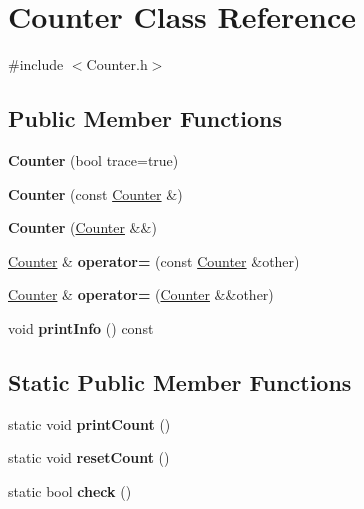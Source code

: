 \hypertarget{classCounter}{}\section{Counter Class Reference}
\label{classCounter}


{\ttfamily \#include $<$Counter.\+h$>$}

\subsection*{Public Member Functions}
\begin{DoxyCompactItemize}
\item 
\mbox{\label{classCounter_a225cab8422bf4e4e9bc6ff87cefb0006}} 
{\bfseries Counter} (bool trace=true)
\item 
\mbox{\label{classCounter_a378bd793744ca20640e633d6cad07dd0}} 
{\bfseries Counter} (const \hyperlink{classCounter}{Counter} \&)
\item 
\mbox{\label{classCounter_a18b8e6ed9520ae5cb28984c22f2aef47}} 
{\bfseries Counter} (\hyperlink{classCounter}{Counter} \&\&)
\item 
\mbox{\label{classCounter_aa5adfc3ad6360b64cfe2835c27b46821}} 
\hyperlink{classCounter}{Counter} \& {\bfseries operator=} (const \hyperlink{classCounter}{Counter} \&other)
\item 
\mbox{\label{classCounter_a1f54066e2bc2a1baf7b475dca14cee23}} 
\hyperlink{classCounter}{Counter} \& {\bfseries operator=} (\hyperlink{classCounter}{Counter} \&\&other)
\item 
\mbox{\label{classCounter_a6b5ac026c089985243bc1a2a55d93502}} 
void {\bfseries print\+Info} () const
\end{DoxyCompactItemize}
\subsection*{Static Public Member Functions}
\begin{DoxyCompactItemize}
\item 
\mbox{\label{classCounter_a4eec2a03bb4f600679e863542251bf57}} 
static void {\bfseries print\+Count} ()
\item 
\mbox{\label{classCounter_a431947d877c04d733f509aeb0e813589}} 
static void {\bfseries reset\+Count} ()
\item 
\mbox{\label{classCounter_a722d1dc34e4414cdaed6fd178b35e8fa}} 
static bool {\bfseries check} ()
\end{DoxyCompactItemize}


